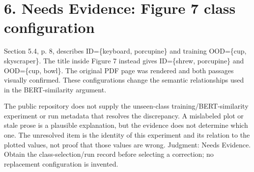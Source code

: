 \documentclass[10pt]{article}
\begin{document}
\section*{6. Needs Evidence: Figure 7 class configuration}
Section 5.4, p. 8, describes ID=\{keyboard, porcupine\} and training OOD=\{cup, skyscraper\}. The title inside Figure 7 instead gives ID=\{shrew, porcupine\} and OOD=\{cup, bowl\}. The original PDF page was rendered and both passages visually confirmed. These configurations change the semantic relationships used in the BERT-similarity argument.\par
The public repository does not supply the unseen-class training/BERT-similarity experiment or run metadata that resolves the discrepancy. A mislabeled plot or stale prose is a plausible explanation, but the evidence does not determine which one. The unresolved item is the identity of this experiment and its relation to the plotted values, not proof that those values are wrong. Judgment: Needs Evidence. Obtain the class-selection/run record before selecting a correction; no replacement configuration is invented.\par
\end{document}
